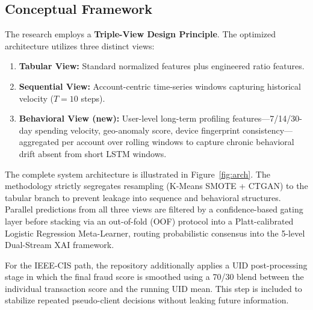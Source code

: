 \documentclass[10pt,a4paper,twocolumn]{article}
\begin{document}
\subsection{Conceptual Framework}
The research employs a \textbf{Triple-View Design Principle}. The optimized architecture utilizes three distinct views:
\begin{enumerate}
    \item \textbf{Tabular View:} Standard normalized features plus engineered ratio features.
    \item \textbf{Sequential View:} Account-centric time-series windows capturing historical velocity ($T{=}10$ steps).
    \item \textbf{Behavioral View (new):} User-level long-term profiling features---7/14/30-day spending velocity, geo-anomaly score, device fingerprint consistency---aggregated per account over rolling windows to capture chronic behavioral drift absent from short LSTM windows.
\end{enumerate}

The complete system architecture is illustrated in Figure~\ref{fig:arch}. The methodology strictly segregates resampling (K-Means SMOTE + CTGAN) to the tabular branch to prevent leakage into sequence and behavioral structures. Parallel predictions from all three views are filtered by a confidence-based gating layer before stacking via an out-of-fold (OOF) protocol into a Platt-calibrated Logistic Regression Meta-Learner, routing probabilistic consensus into the 5-level Dual-Stream XAI framework.

For the IEEE-CIS path, the repository additionally applies a UID post-processing stage in which the final fraud score is smoothed using a 70/30 blend between the individual transaction score and the running UID mean. This step is included to stabilize repeated pseudo-client decisions without leaking future information.
\end{document}
